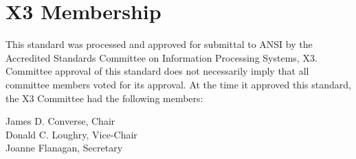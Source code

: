 \chapter*{X3 Membership}
\nolinenumbers

This standard was processed and approved for submittal to ANSI
by the Accredited Standards Committee on Information Processing
Systems, X3. Committee approval of this standard does not
necessarily imply that all committee members voted for its approval.
At the time it approved this standard, the X3 Committee had the
following members:

\begin{flushleft}
James D. Converse, Chair \\
Donald C. Loughry, Vice-Chair \\
Joanne Flanagan, Secretary
\end{flushleft}

